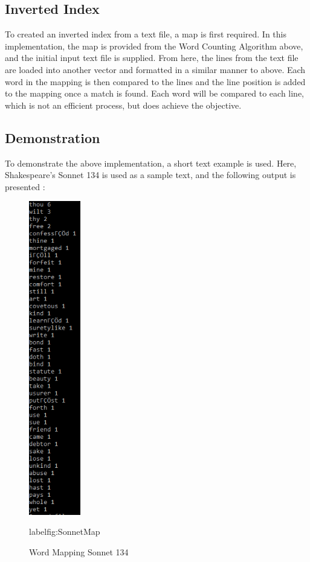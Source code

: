 \documentclass[a4paper, 11pt, onecolumn, conference]{IEEEtran}      %
\begin{document}
\subsection{Inverted Index}
To created an inverted index from a text file, a map is first required\cite{shital_kat_word_nodate}. In this implementation, the map is provided from the Word Counting Algorithm above, and the initial input text file is supplied. From here, the lines from the text file are loaded into another vector and formatted in a similar manner to above. Each word in the mapping is then compared to the lines and the line position is added to the mapping once a match is found\cite{shital_kat_word_nodate}. Each word will be compared to each line, which is not an efficient process, but does achieve the objective.

\subsection{Demonstration}
To demonstrate the above implementation, a short text example is used. Here, Shakespeare's Sonnet 134 is used as a sample text, and the following output is presented \cite{lw_willingham_top_2015}:
\begin{figure}
    \centering
    \includegraphics[width = 0.2\textwidth, height = 1\textwidth]{outputDemon1.png}
    \caption{Word Mapping Sonnet 134}
    label{fig:SonnetMap}
\end{figure}
\end{document}
